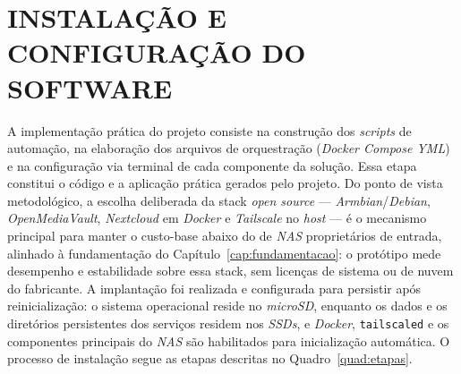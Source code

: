 \section{INSTALAÇÃO E CONFIGURAÇÃO DO SOFTWARE}

A implementação prática do projeto consiste na construção dos \textit{scripts} de automação, na elaboração dos arquivos de orquestração (\textit{Docker Compose YML}) e na configuração via terminal de cada componente da solução. Essa etapa constitui o código e a aplicação prática gerados pelo projeto. Do ponto de vista metodológico, a escolha deliberada da stack \textit{open source} --- \textit{Armbian}/\textit{Debian}, \textit{OpenMediaVault}, \textit{Nextcloud} em \textit{Docker} e \textit{Tailscale} no \textit{host} --- é o mecanismo principal para manter o custo-base abaixo do de \textit{NAS} proprietários de entrada, alinhado à fundamentação do Capítulo~\ref{cap:fundamentacao}: o protótipo mede desempenho e estabilidade sobre essa stack, sem licenças de sistema ou de nuvem do fabricante. A implantação foi realizada e configurada para persistir após reinicialização: o sistema operacional reside no \textit{microSD}, enquanto os dados e os diretórios persistentes dos serviços residem nos \textit{SSDs}, e \textit{Docker}, \texttt{tailscaled} e os componentes principais do \textit{NAS} são habilitados para inicialização automática. O processo de instalação segue as etapas descritas no Quadro~\ref{quad:etapas}.


